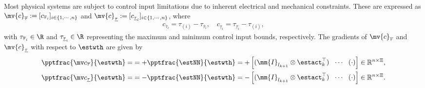 \documentclass[letterpaper, journal]{IEEEtran}
\begin{document}
Most physical systems are subject to control input limitations due to inherent electrical and mechanical constraints.
These are expressed as $\mv{c}_{\overline \tau}:= [c_{\overline \tau_i}]_{i\in\{1,\cdots,n\}}$ and $\mv{c}_{\underline\tau}:= [c_{\underline\tau_i}]_{i\in\{1,\cdots,n\}}$, where
\begin{equation}
    \begin{aligned}
        c_{\overline \tau_i}=\tau_{(i)} - {\tau_{\overline \tau_i}}
        ,
        \quad
        c_{\underline\tau_i}={\tau_{\underline\tau_i}}-\tau_{(i)}
        ,
    \end{aligned}
    \label{eq:cstr:input:bound}
\end{equation}
with $\tau_{\overline \tau_i}\in\R$ and $\tau_{\underline\tau_i}\in\R$ representing the maximum and minimum control input bounds, respectively.
The gradients of $\mv{c}_{\overline \tau}$ and $\mv{c}_{\underline\tau}$ with respect to $\estwth$ are given by
\begin{equation}
    \begin{aligned}
        \pptfrac{\mv c_{\overline \tau}}{\estwth}
        =& 
        = 
            +\pptfrac{\estNN}{\estwth}
        =
        +
        \begin{bmatrix}
            (\mm{I}_{l_{k+1}}\otimes \estact_{k}^\top)&
            \!\cdots\! &
            (
                \cdot
            )
        \end{bmatrix} 
        \in
        \mathbb R^{n\times \Xi}
        , 
        \\
        \pptfrac{\mv c_{\underline\tau}}{\estwth}         
        =
        & 
        = 
        -\pptfrac{\estNN}{\estwth}
        =
        -\begin{bmatrix}
            (\mm{I}_{l_{k+1}}\otimes \estact_{k}^\top)&
            \!\cdots\! &
            (
                \cdot
            )
        \end{bmatrix} 
        \in
        \mathbb R^{n\times \Xi}
        .
    \end{aligned}
    \label{eq:cstr:input:bound:grad}
\end{equation}
\end{document}
